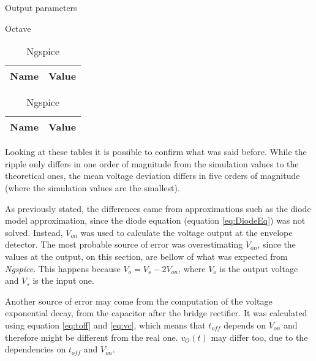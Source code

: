 \begin{table}[H]
    \caption{Output parameters}
    \begin{subtable}{.5\linewidth}
      \centering
        \caption{Octave}
        \begin{tabular}{ll}
        \hline    
        {\bf Name} & {\bf Value} \\ \hline
        
        \end{tabular}
        \label{tab:OutParamOc}
    \end{subtable}%
    \begin{subtable}{.5\linewidth}
      \centering
        \caption{Ngspice}
        \begin{tabular}{ll}
        \hline    
        {\bf Name} & {\bf Value} \\ \hline
        
        \end{tabular}
        \label{tab:OutParamNG}
    \end{subtable} 
    \label{tab:OutParam}
\end{table}






\indent

Looking at these tables it is possible to confirm what was said before. While the ripple only differs in one order of magnitude from the simulation values to the theoretical ones, the mean voltage deviation differs in five orders of magnitude (where the simulation values are the smallest).

As previously stated, the differences came from approximations such as the diode model approximation, since the diode equation (equation \ref{eq:DiodeEq}) was not solved. Instead, $V_{on}$ was used to calculate the voltage output at the envelope detector. The most probable source of error was overestimating $V_{on}$, since the values at the output, on this section, are bellow of what was expected from \textit{Ngspice}. This happens because $V_o= V_s-2V_{on}$, where $V_o$ is the output voltage and $V_s$ is the input one. 

Another source of error may come from the computation of the voltage exponential decay, from the capacitor after the bridge rectifier. It was calculated using equation \ref{eq:toff} and \ref{eq:vc}, which means that $t_{off}$ depends on $V_{on}$ and therefore might be different from the real one. $v_O(t)$ may differ too, due to the dependencies on $t_{off}$ and $V_{on}$.
